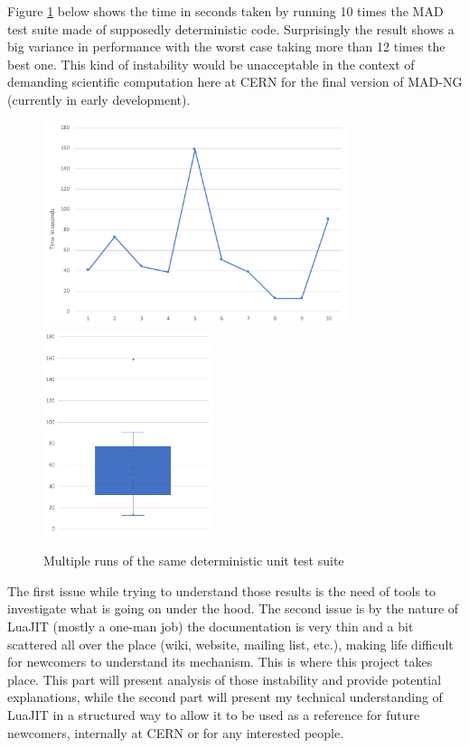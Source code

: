 
Figure \ref{fig:pb-statement} below shows the time in seconds taken by running 10
times the MAD test suite made of supposedly deterministic code. Surprisingly the
result shows a big variance in performance with the worst case taking more than
12 times the best one. This kind of instability would be unacceptable in the
context of demanding scientific computation here at CERN for the final version
of MAD-NG (currently in early development).

\begin{figure}[H]
    \centering
	\includegraphics[height=6cm]{./Images/pb-statement-curve.pdf}
	\includegraphics[height=6cm]{./Images/pb-statement-box.pdf}
    \caption{Multiple runs of the same deterministic unit test suite}
    \label{fig:pb-statement}
\end{figure}

The first issue while trying to understand those results is the need of tools
to investigate what is going on under the hood. The second issue is by the
nature of LuaJIT (mostly a one-man job) the documentation is very thin and a bit
scattered all over the place (wiki, website, mailing list, etc.), making life
difficult for newcomers to understand its mechanism.
This is where this project takes place. This part will present analysis of those
instability and provide potential explanations, while the second part
will present my technical understanding of LuaJIT in a structured way to allow
it to be used as a reference for future newcomers, internally at CERN or for any
interested people.
